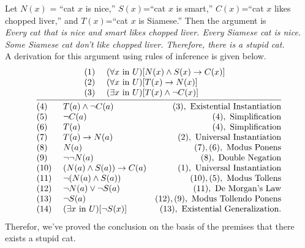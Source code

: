 \documentclass[a4paper,english,12pt]{article}
\begin{document}
\begin{exmp} Let $N(x)$ = ``cat $x$ is nice,'' $S(x)$=``cat $x$ is smart,'' $C(x)$=``cat $x$ likes chopped liver,'' and $T(x)$=``cat $x$ is Siamese.'' Then the argument is\\ 
\emph{Every cat that is nice and smart likes chopped liver. Every Siamese cat is nice. Some Siamese cat don't like chopped liver. Therefore, there is a stupid cat.}\\

A derivation for this argument using rules of inference is given below.
\begin{equation}
\infer{\begin{array}
	{@{}llr@{}llr@{}llr@{}}
	(4)~&T(a)\wedge \neg C(a) & (3), \text{ Existential Instantiation}\\
	(5)~&\neg C(a)            & (4), \text{ Simplification}\\
	(6)~&T(a)                 & (4), \text{ Simplification}\\
	(7)~&T(a)\rightarrow N(a) & (2), \text{ Universal Instantiation}\\
	(8)~&N(a)                 & (7),(6), \text{ Modus Ponens}\\
	(9)~&\neg\neg N(a)        & (8), \text{ Double Negation}\\
	(10)~&(N(a)\wedge S(a))\rightarrow C(a) &(1), \text{ Universal Instantiation}\\
  (11)~&\neg(N(a)\wedge S(a))& (10),(5), \text{ Modus Tollens}\\
  (12)~&\neg N(a)\vee\neg S(a)& (11), \text{ De Morgan's Law}\\
  (13)~&\neg S(a)           & (12), (9), \text{ Modus Tollendo Ponens}\\
  (14)&(\exists x \text{ in } U)[\neg S(x)]  & (13), \text{ Existential Generalization}.
	\end{array}}
	{\begin{array}
	{@{}llr@{}llr@{}llr@{}} 
	(1)~&(\forall x \text{ in } U) [N(x)\wedge S(x) \rightarrow C(x)]&\\
	(2)~&(\forall x \text{ in } U) [T(x)\rightarrow N(x)] &\\
	(3)~&(\exists x \text{ in } U) [T(x)\wedge \neg C(x)] &
	\end{array}}
\end{equation}
Therefor, we've proved the conclusion on the basis of the premises that there exists a stupid cat.
\end{exmp}
\end{document}
